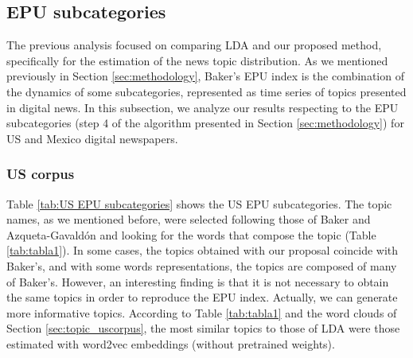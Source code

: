 \documentclass{article}
\begin{document}
\subsection{EPU subcategories} \label{EPU subcategories}

The previous analysis focused on comparing LDA and our proposed method, specifically for the estimation of the news topic distribution. As we mentioned previously in Section \ref{sec:methodology}, Baker's EPU index is the combination of the dynamics of some subcategories, represented as time series of topics presented in digital news. In this subsection, we analyze our results respecting to the EPU subcategories (step 4 of the algorithm presented in Section \ref{sec:methodology}) for US and Mexico digital newspapers.

\subsubsection{US corpus}

Table \ref{tab:US EPU subcategories} shows the US EPU subcategories. The topic names, as we mentioned before, were selected following those of Baker and Azqueta-Gavaldón and looking for the words that compose the topic (Table \ref{tab:tabla1}). In some cases, the topics obtained with our proposal coincide with Baker's, and with some words representations, the topics are composed of many of Baker's. However, an interesting finding is that it is not necessary to obtain the same topics in order to reproduce the EPU index. Actually, we can generate more informative topics. According to Table \ref{tab:tabla1} and the word clouds of Section \ref{sec:topic_uscorpus}, the most similar topics to those of LDA were those estimated with word2vec embeddings (without pretrained weights). 
\end{document}
